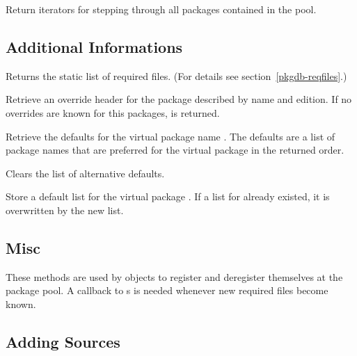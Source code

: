 \documentclass[10pt]{article}
\begin{document}
Return iterators for stepping through all packages contained in the
pool.


\subsection{Additional Informations}
Returns the static list of required files. (For details see
section~\ref{pkgdb-reqfiles}.)

Retrieve an override header for the package described by name and
edition. If no overrides are known for this packages,  is
returned.

Retrieve the defaults for the virtual package name . The
defaults are a list of package names that are preferred for the
virtual package in the returned order.

Clears the list of alternative defaults.

Store a default list  for the virtual package
. If a list for  already existed, it is
overwritten by the new list.


\subsection{Misc}

These methods are used by  objects to register and
deregister themselves at the package pool. A callback to
s is needed whenever new required files become known.



\subsection{Adding Sources}
\label{pkgdb-addsource}
\end{document}
